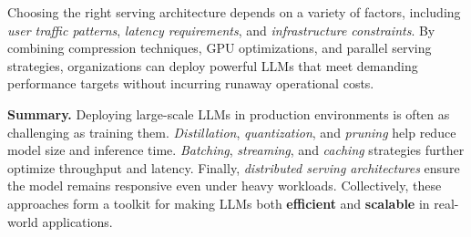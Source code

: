 \noindent
Choosing the right serving architecture depends on a variety of factors, including \emph{user traffic patterns}, \emph{latency requirements}, and \emph{infrastructure constraints}. By combining compression techniques, GPU optimizations, and parallel serving strategies, organizations can deploy powerful LLMs that meet demanding performance targets without incurring runaway operational costs.

\bigskip
\noindent
\textbf{Summary.} Deploying large-scale LLMs in production environments is often as challenging as training them. \emph{Distillation}, \emph{quantization}, and \emph{pruning} help reduce model size and inference time. \emph{Batching}, \emph{streaming}, and \emph{caching} strategies further optimize throughput and latency. Finally, \emph{distributed serving architectures} ensure the model remains responsive even under heavy workloads. Collectively, these approaches form a toolkit for making LLMs both \textbf{efficient} and \textbf{scalable} in real-world applications.
